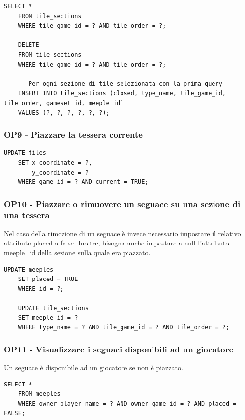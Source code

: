 \begin{lstlisting}[style=sql]
    SELECT *
    FROM tile_sections
    WHERE tile_game_id = ? AND tile_order = ?;

    DELETE
    FROM tile_sections
    WHERE tile_game_id = ? AND tile_order = ?;

    -- Per ogni sezione di tile selezionata con la prima query
    INSERT INTO tile_sections (closed, type_name, tile_game_id, tile_order, gameset_id, meeple_id)
    VALUES (?, ?, ?, ?, ?, ?);
\end{lstlisting}


\subsubsection*{OP9 - Piazzare la tessera corrente}
\begin{lstlisting}[style=sql]
    UPDATE tiles
    SET x_coordinate = ?,
        y_coordinate = ?
    WHERE game_id = ? AND current = TRUE;
\end{lstlisting}

\subsubsection*{OP10 - Piazzare o rimuovere un seguace su una sezione di una tessera}
Nel caso della rimozione di un seguace è invece necessario impostare il relativo attributo placed a false. Inoltre, bisogna anche impostare a null l'attributo meeple\_id della sezione sulla quale era piazzato.
\medskip

\begin{lstlisting}[style=sql]
    UPDATE meeples
    SET placed = TRUE
    WHERE id = ?;

    UPDATE tile_sections
    SET meeple_id = ?
    WHERE type_name = ? AND tile_game_id = ? AND tile_order = ?;
\end{lstlisting}

\subsubsection*{OP11 - Visualizzare i seguaci disponibili ad un giocatore}
Un seguace è disponibile ad un giocatore se non è piazzato.
\medskip

\begin{lstlisting}[style=sql]
    SELECT *
    FROM meeples
    WHERE owner_player_name = ? AND owner_game_id = ? AND placed = FALSE;
\end{lstlisting}

